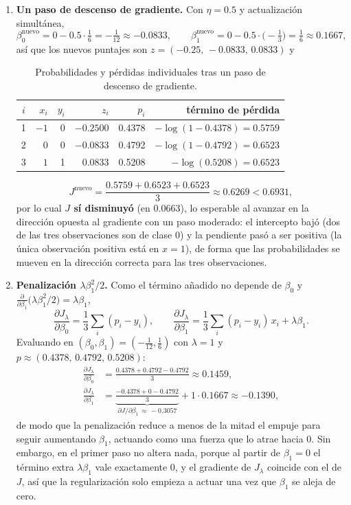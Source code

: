 \begin{enumerate}
\item \textbf{Un paso de descenso de gradiente.}
Con $\eta=0.5$ y actualización simultánea,
\[
    \beta_0^{\text{nuevo}} = 0 - 0.5\cdot\tfrac16 = -\tfrac{1}{12} \approx -0.0833,
    \qquad
    \beta_1^{\text{nuevo}} = 0 - 0.5\cdot\bigl(-\tfrac13\bigr) = \tfrac16 \approx 0.1667 ,
\]
así que los nuevos puntajes son $z=(-0.25,\,-0.0833,\,0.0833)$ y

\begin{table}[H]
\centering
\begin{tabular}{crrrrr}
\toprule
$i$ & $x_i$ & $y_i$ & $z_i$ & $p_i$ & término de pérdida \\
\midrule
1 & $-1$ & 0 & $-0.2500$ & 0.4378 & $-\log(1-0.4378) = 0.5759$ \\
2 & $0$  & 0 & $-0.0833$ & 0.4792 & $-\log(1-0.4792) = 0.6523$ \\
3 & $1$  & 1 & $0.0833$  & 0.5208 & $-\log(0.5208) = 0.6523$ \\
\bottomrule
\end{tabular}
\caption{Probabilidades y pérdidas individuales tras un paso de descenso de gradiente.}
\end{table}

\[
    J^{\text{nuevo}} = \frac{0.5759+0.6523+0.6523}{3} \approx 0.6269 < 0.6931 ,
\]
por lo cual \textbf{$J$ sí disminuyó} (en $0.0663$), lo esperable al
avanzar en la dirección opuesta al gradiente con un paso moderado: el
intercepto bajó (dos de las tres observaciones son de clase $0$) y la
pendiente pasó a ser positiva (la única observación positiva está en
$x=1$), de forma que las probabilidades se mueven en la dirección
correcta para las tres observaciones.

\item \textbf{Penalización $\lambda\beta_1^2/2$.}
Como el término añadido no depende de $\beta_0$ y
$\frac{\partial}{\partial\beta_1}\bigl(\lambda\beta_1^2/2\bigr)=\lambda\beta_1$,
\[
    \frac{\partial J_\lambda}{\partial\beta_0} = \frac13\sum_i (p_i-y_i),
    \qquad
    \frac{\partial J_\lambda}{\partial\beta_1} = \frac13\sum_i (p_i-y_i)\,x_i + \lambda\beta_1 .
\]
Evaluando en $(\beta_0,\beta_1)=(-\tfrac1{12},\tfrac16)$ con $\lambda=1$
y $p\approx(0.4378,\,0.4792,\,0.5208)$:
\begin{align*}
    \frac{\partial J_\lambda}{\partial\beta_0}
    &= \frac{0.4378+0.4792-0.4792}{3} \approx 0.1459,\\
    \frac{\partial J_\lambda}{\partial\beta_1}
    &= \underbrace{\frac{-0.4378+0-0.4792}{3}}_{\partial J/\partial\beta_1\,\approx\,-0.3057}
    + 1\cdot0.1667 \approx -0.1390 ,
\end{align*}
de modo que la penalización reduce a menos de la mitad el empuje para
seguir aumentando $\beta_1$, actuando como una fuerza que lo atrae hacia
$0$. Sin embargo, en el primer paso no altera nada, porque al partir de
$\beta_1=0$ el término extra $\lambda\beta_1$ vale exactamente $0$, y el
gradiente de $J_\lambda$ coincide con el de $J$, así que la
regularización solo empieza a actuar una vez que $\beta_1$ se aleja de
cero.


\end{enumerate}
